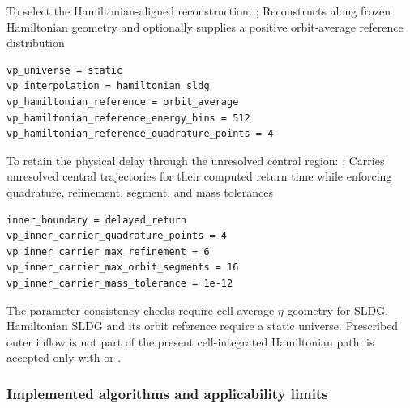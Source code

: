To select the Hamiltonian-aligned reconstruction:
{;
 }
{Reconstructs along frozen Hamiltonian geometry and optionally supplies a
 positive orbit-average reference distribution}
\begin{lstlisting}
vp_universe = static
vp_interpolation = hamiltonian_sldg
vp_hamiltonian_reference = orbit_average
vp_hamiltonian_reference_energy_bins = 512
vp_hamiltonian_reference_quadrature_points = 4
\end{lstlisting}
To retain the physical delay through the unresolved central region:
{;
 }
{Carries unresolved central trajectories for their computed return time while
 enforcing quadrature, refinement, segment, and mass tolerances}
\begin{lstlisting}
inner_boundary = delayed_return
vp_inner_carrier_quadrature_points = 4
vp_inner_carrier_max_refinement = 6
vp_inner_carrier_max_orbit_segments = 16
vp_inner_carrier_mass_tolerance = 1e-12
\end{lstlisting}

The parameter consistency checks require cell-average \(\eta\) geometry for SLDG.
Hamiltonian SLDG and its orbit reference require a static universe.  Prescribed
outer inflow is not part of the present cell-integrated Hamiltonian path.
 is accepted only with
 or .

\subsubsection{Implemented algorithms and applicability limits}

